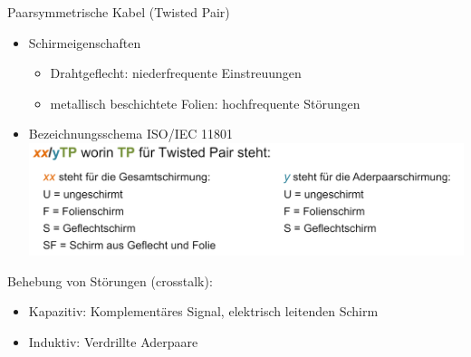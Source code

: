     \begin{definition}{Paarsymmetrische Kabel (Twisted Pair)}
        \begin{itemize}
            \item Schirmeigenschaften
            \begin{itemize}
                \item Drahtgeflecht: niederfrequente Einstreuungen
                \item metallisch beschichtete Folien: hochfrequente Störungen
            \end{itemize}
            \item Bezeichnungsschema ISO/IEC 11801\\
            \includegraphics[width=\linewidth]{images/STP_Schirmeigenschaften.png}
        \end{itemize}
        Behebung von Störungen (crosstalk):
        \begin{itemize}
            \item Kapazitiv: Komplementäres Signal, elektrisch leitenden Schirm
            \item Induktiv: Verdrillte Aderpaare
        \end{itemize}
    \end{definition}

    

    
        
    